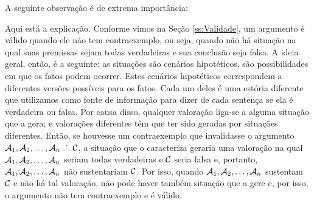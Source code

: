 A seguinte observação é de extrema importância:
	\label{SusVal}

Aqui está a explicação.
Conforme vimos na Seção \ref{ss:Validade}, um argumento é válido quando ele não tem contraexemplo, ou seja, quando não há situação na qual suas premissas sejam todas verdadeiras e sua conclusão seja falsa.
A ideia geral, então, é a seguinte:
as situações são cenários hipotéticos, são possibilidades em que os fatos podem ocorrer.
Estes cenários hipotéticos correspondem a diferentes versões possíveis para os fatos.
Cada um deles é uma estória diferente que utilizamos como fonte de informação para dizer de cada sentença se ela é verdadeira ou falsa.
Por causa disso, qualquer valoração liga-se a alguma situação que a gera; e valorações diferentes têm que ter sido geradas por situações diferentes.
Então, se houvesse um contraexemplo que invalidasse o argumento $\mathcal{A}_1, \mathcal{A}_2, \ldots, \mathcal{A}_n \mathrel{\ldotp\dot{}\,\ldotp} \mathcal{C}$, a situação que o caracteriza geraria uma valoração na qual $\mathcal{A}_1, \mathcal{A}_2, \ldots, \mathcal{A}_n$ seriam todas verdadeiras e $\mathcal{C}$ seria falsa e, portanto, $\mathcal{A}_1, \mathcal{A}_2, \ldots, \mathcal{A}_n$ não sustentariam $\mathcal{C}$.
Por isso, quando $\mathcal{A}_1, \mathcal{A}_2, \ldots, \mathcal{A}_n$ sustentam $\mathcal{C}$ e não há tal valoração, não pode haver também situação que a gere e, por isso, o argumento não tem contraexemplo e é válido.

